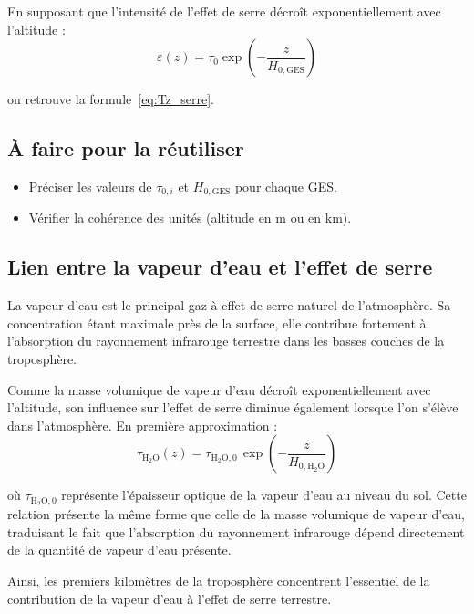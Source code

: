 \documentclass[a4paper,11pt]{article}
\begin{document}
En supposant que l'intensité de l'effet de serre décroît exponentiellement avec
l'altitude :
\begin{equation}
  \varepsilon(z) = \tau_0 \exp\!\left(-\frac{z}{H_{0,\mathrm{GES}}}\right)
\end{equation}

on retrouve la formule~\eqref{eq:Tz_serre}.

\subsection{À faire pour la réutiliser}

\begin{piste}
\begin{itemize}
  \item Préciser les valeurs de $\tau_{0,i}$ et $H_{0,\mathrm{GES}}$ pour chaque GES.
  \item Vérifier la cohérence des unités (altitude en m ou en km).
\end{itemize}
\end{piste}

\subsection{Lien entre la vapeur d'eau et l'effet de serre}

La vapeur d'eau est le principal gaz à effet de serre naturel de l'atmosphère.
Sa concentration étant maximale près de la surface, elle contribue fortement à
l'absorption du rayonnement infrarouge terrestre dans les basses couches de la
troposphère.

Comme la masse volumique de vapeur d'eau décroît exponentiellement avec
l'altitude, son influence sur l'effet de serre diminue également lorsque l'on
s'élève dans l'atmosphère. En première approximation :
\begin{equation}
  \tau_{\mathrm{H_2O}}(z)
  = \tau_{\mathrm{H_2O},0}\,\exp\!\left(-\frac{z}{H_{0,\mathrm{H_2O}}}\right)
\end{equation}

où $\tau_{\mathrm{H_2O},0}$ représente l'épaisseur optique de la vapeur d'eau
au niveau du sol. Cette relation présente la même forme que celle de la masse
volumique de vapeur d'eau, traduisant le fait que l'absorption du rayonnement
infrarouge dépend directement de la quantité de vapeur d'eau présente.

Ainsi, les premiers kilomètres de la troposphère concentrent l'essentiel de la
contribution de la vapeur d'eau à l'effet de serre terrestre.
\end{document}
